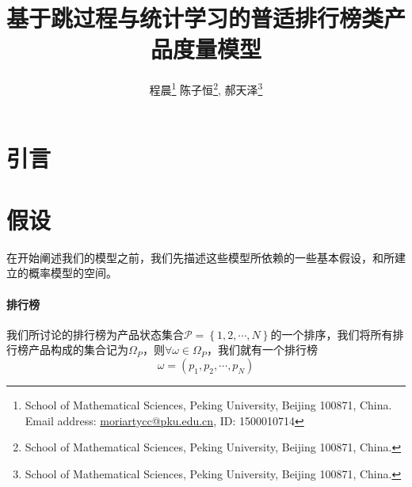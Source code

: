 \documentclass[UTF8]{ctexart}
\theoremstyle{plain}
\theoremstyle{definition}
\theoremstyle{remark}
\begin{document}
	\setcounter{footnote}{1}
	\title{基于跳过程与统计学习的普适排行榜类产品度量模型}
	\author{程晨\footnote{School of Mathematical Sciences, Peking University, Beijing 100871, China. Email address:
			\href{mailto:moriartycc@pku.edu.cn}{moriartycc@pku.edu.cn}, ID: 1500010714} \quad 陈子恒\footnote{School of Mathematical Sciences, Peking University, Beijing 100871, China. }, \quad 郝天泽\footnote{School of Mathematical Sciences, Peking University, Beijing 100871, China. }}
	\date{}
	\maketitle
	\newpage
	\tableofcontents
	\newpage
	\section{引言}
	\section{假设}
	在开始阐述我们的模型之前，我们先描述这些模型所依赖的一些基本假设，和所建立的概率模型的空间。
	\paragraph{排行榜} 我们所讨论的排行榜为产品状态集合$\mathcal{P}=\left\{1,2,\cdots,N \right\}$的一个排序，我们将所有排行榜产品构成的集合记为$\Omega_P$，则$\forall \omega \in \Omega_P$，我们就有一个排行榜
	$$
	\omega = (p_1,p_2,\cdots,p_N)
	$$
\end{document}
